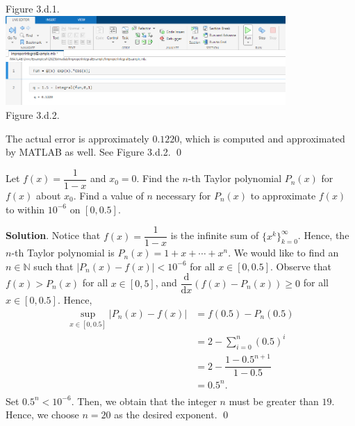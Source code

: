 \documentclass[11pt]{article}
\theoremstyle{break}
\newcommand{\dd}{\text{d}}
\numberwithin{equation}{theorem}
\begin{document}
\begin{enumerate}
\begin{center}
        Figure 3.d.1.\\\vspace{1.9em}
        \includegraphics[width=0.8\textwidth]{P3d2.png}\\
        Figure 3.d.2.
    \end{center}
    The actual error is approximately $0.1220$, which is computed and approximated by MATLAB as well. See Figure 3.d.2. \qed
\end{enumerate}

\newpage
\begin{problem}\label{problem 4}
    Let $f(x)=\dfrac{1}{1-x}$ and $x_0=0$. Find the $n$-th Taylor polynomial $P_n(x)$ for $f(x)$ about $x_0$. Find a value of $n$ necessary for $P_n(x)$ to approximate $f(x)$ to within $10^{-6}$ on $[0, 0.5]$.
\end{problem}
\textbf{Solution}. Notice that $f(x)=\dfrac{1}{1-x}$ is the infinite sum of $\{x^k\}_{k=0}^\infty$. Hence, the $n$-th Taylor polynomial is $\displaystyle P_n(x)=1+x+\cdots+x^n$. We would like to find an $n\in\mathbb{N}$ such that $|P_n(x)-f(x)|<10^{-6}$ for all $x\in[0, 0.5]$. Observe that $f(x)>P_n(x)$ for all $x\in[0, 5]$, and $\dfrac{\dd}{\dd x}\left(f(x)-P_n(x)\right)\geq 0$ for all $x\in[0, 0.5]$. Hence, \vspace{-0.6em}
\begin{align*}
    \sup_{x\in[0, 0.5]}|P_n(x)-f(x)|&=f(0.5)-P_n(0.5)\\
    &=2-\sum_{i=0}^{n}(0.5)^i\\
    &=2-\dfrac{1-0.5^{n+1}}{1-0.5}\\
    &=0.5^n.\\[-3.4em]
\end{align*}
Set $0.5^n<10^{-6}$. Then, we obtain that the integer $n$ must be greater than $19$. Hence, we choose $n=20$ as the desired exponent. \qed
\end{document}
